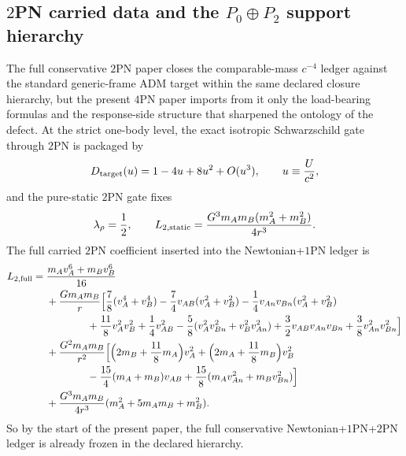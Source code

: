 \documentclass[11pt]{article}
\begin{document}
\subsection{\texorpdfstring{$2$}{2}PN carried data and the \texorpdfstring{$P_0\oplus P_2$}{P0 + P2} support hierarchy}
\label{app:carry-forward-2pn}

The full conservative $2$PN paper closes the comparable-mass $c^{-4}$ ledger
 against the standard generic-frame ADM target within the same declared closure
 hierarchy, but the present $4$PN paper imports from it only the load-bearing
 formulas and the response-side structure that sharpened the ontology of the
 defect.  At the strict one-body level, the exact isotropic Schwarzschild gate
 through $2$PN is packaged by
\[
D_{\rm target}(u)=1-4u+8u^2+O(u^3),
\qquad
u\equiv\frac{U}{c^2},
\]
and the pure-static $2$PN gate fixes
\[
\lambda_\rho=\frac12,
\qquad
L_{2,\rm static}=\frac{G^3m_A m_B(m_A^2+m_B^2)}{4r^3}.
\]
The full carried $2$PN coefficient inserted into the Newtonian+$1$PN ledger is
\[
\begin{aligned}
L_{2,\rm full}
={}&\frac{m_Av_A^6+m_Bv_B^6}{16}
\\
&+\frac{Gm_A m_B}{r}
\Big[
\frac78(v_A^4+v_B^4)
-\frac74 v_{AB}(v_A^2+v_B^2)
-\frac14 v_{An}v_{Bn}(v_A^2+v_B^2)
\\
&\hspace{4em}
+\frac{11}{8}v_A^2v_B^2
+\frac14 v_{AB}^2
-\frac58(v_A^2v_{Bn}^2+v_B^2v_{An}^2)
+\frac32 v_{AB}v_{An}v_{Bn}
+\frac38 v_{An}^2v_{Bn}^2
\Big]
\\
&+\frac{G^2m_A m_B}{r^2}
\Big[
\Big(2m_B+\frac{11}{8}m_A\Big)v_A^2
+\Big(2m_A+\frac{11}{8}m_B\Big)v_B^2
\\
&\hspace{4em}
-\frac{15}{4}(m_A+m_B)v_{AB}
+\frac{15}{8}(m_Av_{An}^2+m_Bv_{Bn}^2)
\Big]
\\
&+\frac{G^3m_A m_B}{4r^3}(m_A^2+5m_A m_B+m_B^2).
\end{aligned}
\]
So by the start of the present paper, the full conservative
 Newtonian+$1$PN+$2$PN ledger is already frozen in the declared hierarchy.
\end{document}
